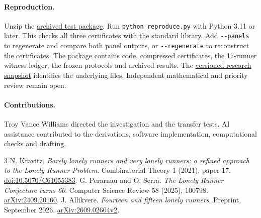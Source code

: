 \documentclass[11pt,letterpaper]{article}
\newcommand{\snap}{https://github.com/tradingartofwar/the-lonely-runner-conjecture/tree/b693d00938d0f320eab9c8c0349c08e8bb8b10cb}
\begin{document}
\paragraph{Reproduction.}
Unzip the \href{https://raw.githubusercontent.com/tradingartofwar/the-lonely-runner-conjecture/a956325b709e41e25067ff742b215ca2a2dc1f3a/experiments/forced-overlap/paper/runner-additions/Runner_Addition_Tests.zip}{archived test package}. Run \texttt{python reproduce.py} with Python 3.11 or later. This checks all three certificates with the standard library. Add \verb|--panels| to regenerate and compare both panel outputs, or \verb|--regenerate| to reconstruct the certificates. The package contains code, compressed certificates, the 17-runner witness ledger, the frozen protocols and archived results. The \href{\snap}{versioned research snapshot} identifies the underlying files. Independent mathematical and priority review remain open.

\paragraph{Contributions.}
Troy Vance Williams directed the investigation and the transfer tests. AI assistance contributed to the derivations, software implementation, computational checks and drafting.

\begin{thebibliography}{3}\small
{} N. Kravitz. \emph{Barely lonely runners and very lonely runners: a refined approach to the Lonely Runner Problem}. Combinatorial Theory 1 (2021), paper 17. \href{https://doi.org/10.5070/C61055383}{doi:10.5070/C61055383}.
 G. Perarnau and O. Serra. \emph{The Lonely Runner Conjecture turns 60}. Computer Science Review 58 (2025), 100798. \href{https://arxiv.org/abs/2409.20160}{arXiv:2409.20160}.
 J. Allikvere. \emph{Fourteen and fifteen lonely runners}. Preprint, September 2026. \href{https://arxiv.org/abs/2609.02604v2}{arXiv:2609.02604v2}.
\end{thebibliography}
\end{document}
